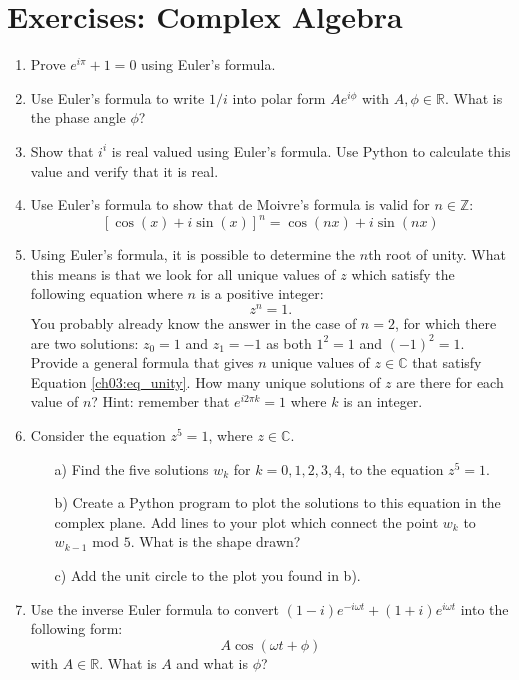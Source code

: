 \newpage
\section{Exercises: Complex Algebra}

\begin{enumerate}
\item Prove $e^{i\pi}+1=0$ using Euler's formula. 
\item Use Euler's formula to write $1/i$ into polar form $Ae^{i\phi}$ with $A,\phi\in\mathbb{R}$. What is the phase angle $\phi$?
\item Show that $i^{i}$ is real valued using Euler's formula. Use Python to calculate this value and verify that it is real. 
\item Use Euler's formula to show that de Moivre's formula is valid for $n\in\mathbb{Z}$:
$$[\cos(x)+i\sin(x)]^{n}=\cos(nx)+i\sin(nx)$$

\item Using Euler's formula, it is possible to determine the $n$th root of unity. What this means is that we look for all unique values of $z$ which satisfy the following equation where $n$ is a positive integer:
\begin{equation}
    z^{n}=1.
    \label{ch03:eq_unity}
\end{equation}
You probably already know the answer in the case of $n=2$, for which there are two solutions: $z_{0}=1$ and $z_{1}=-1$ as both $1^{2}=1$ and $(-1)^{2}=1$. \\
Provide a general formula that gives $n$ unique values of $z\in\mathbb{C}$ that
satisfy Equation \ref{ch03:eq_unity}. How many unique solutions of $z$ are there
for each value of $n$? Hint: remember that $e^{i 2\pi k} = 1$ where
$k$ is an integer. 
\item Consider the equation $z^{5}=1$, where $z\in\mathbb{C}$. 
\begin{itemize}
    \item[a)] Find the five solutions $w_{k}$ for $k=0,1,2,3,4$, to the equation $z^{5}=1$. 
    \item[b)] Create a Python program to plot the solutions to this equation in the complex plane. Add lines to your plot which connect the point $w_{k}$ to $w_{k-1}$ mod $5$. What is the shape drawn?
    \item[c)] Add the unit circle to the plot you found in b). 
\end{itemize}

\item Use the inverse Euler formula to convert $(1-i) e^{-i \omega t} + (1+i) e^{i
  \omega t}$ into the following form:
\begin{equation*}
    A \cos(\omega t  + \phi)
\end{equation*}
with $A\in \mathbb{R}$. What is $A$ and what is $\phi$?


\end{enumerate}
